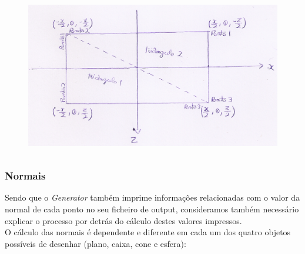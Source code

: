 \documentclass{article}
\begin{document}
\begin{figure}[H]
\centering
\includegraphics[height=7cm]{planeMath.png}
\end{figure}

\subsubsection{Normais}

Sendo que o \textit{Generator} também imprime informações relacionadas com o valor da normal de cada ponto no seu ficheiro de output, consideramos também necessário explicar o processo por detrás do cálculo destes valores impressos.\\
O cálculo das normais é dependente e diferente em cada um dos quatro objetos possíveis de desenhar (plano, caixa, cone e esfera):
\end{document}

